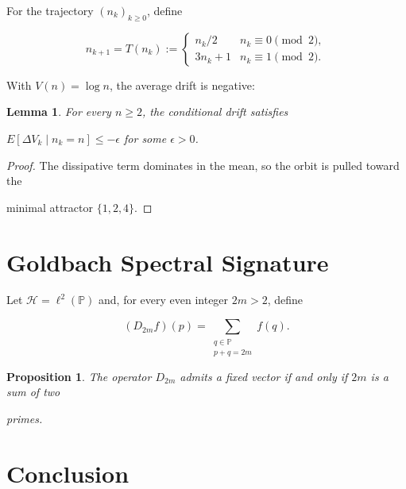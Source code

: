 ﻿\documentclass[11pt,a4paper]{amsart}
\newtheorem{lemma}[theorem]{Lemma}
\newtheorem{proposition}[theorem]{Proposition}
\begin{document}
For the trajectory $(n_k)_{k\ge 0}$, define

\[

  n_{k+1}=T(n_k):=

  \begin{cases}

    n_k/2 & n_k \equiv 0 \pmod 2,\\

    3n_k+1 & n_k \equiv 1 \pmod 2.

  \end{cases}

\]

With $V(n)=\log n$, the average drift is negative:

\begin{lemma}

For every $n\ge 2$, the conditional drift satisfies

$E[\Delta V_k \mid n_k=n] \le -\epsilon$ for some $\epsilon>0$.

\end{lemma}



\begin{proof}

The dissipative term dominates in the mean, so the orbit is pulled toward the

minimal attractor $\{1,2,4\}$.

\end{proof}



\section{Goldbach Spectral Signature}

Let $\mathcal H=\ell^2(\mathbb P)$ and, for every even integer $2m>2$, define

\[

  (D_{2m}f)(p)=\sum_{\substack{q\in\mathbb P\\ p+q=2m}} f(q).

\]

\begin{proposition}

The operator $D_{2m}$ admits a fixed vector if and only if $2m$ is a sum of two

primes.

\end{proposition}



\section{Conclusion}
\end{document}
